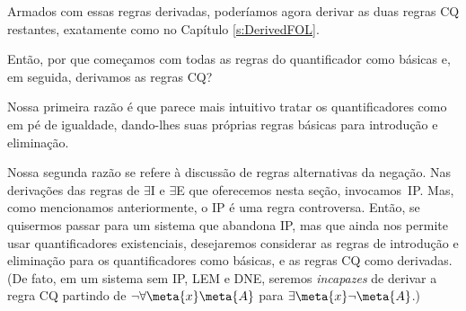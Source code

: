 Armados com essas regras derivadas, poderíamos agora derivar as duas regras CQ restantes, exatamente como no Capítulo  \ref{s:DerivedFOL}.

Então, por que começamos com todas as regras do quantificador como básicas e, em seguida, derivamos as regras CQ?

Nossa primeira razão é que parece mais intuitivo tratar os quantificadores como em pé de igualdade, dando-lhes suas próprias regras básicas para introdução e eliminação.

Nossa segunda razão se refere à discussão de regras alternativas da negação. Nas derivações das regras de $\exists$I e $ \exists$E que oferecemos nesta seção, invocamos~IP. Mas, como mencionamos anteriormente, o IP é uma regra controversa. Então, se quisermos passar para um sistema que abandona IP, mas que ainda nos permite usar quantificadores existenciais, desejaremos considerar as regras de introdução e eliminação para os quantificadores como básicas, e as regras CQ como derivadas. (De fato, em um sistema sem IP, LEM e DNE, seremos \emph{incapazes} de derivar a regra CQ partindo de $\enot \forall \meta{x} \meta{A}$ para $\exists \meta{x} \enot \meta{A}$.) 